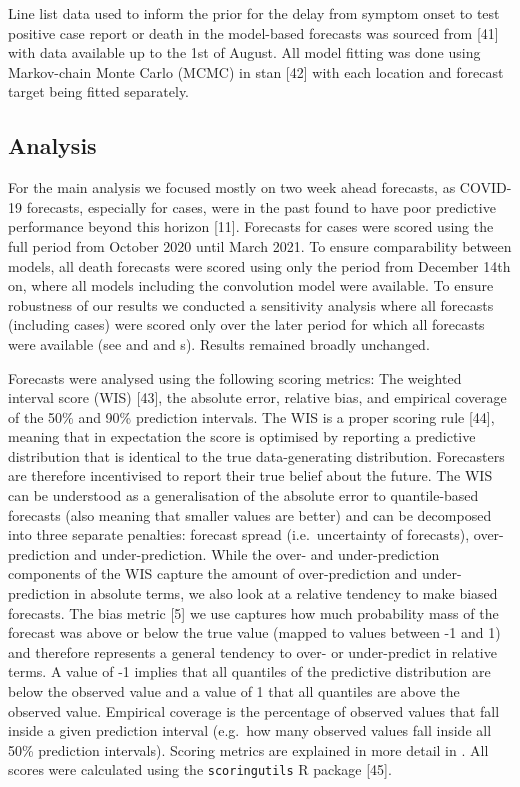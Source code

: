 \documentclass[10pt,letterpaper]{article}
\begin{document}
Line list data used to inform the prior for the delay from symptom onset
to test positive case report or death in the model-based forecasts was
sourced from {[}41{]} with data available up to the 1st of August. All
model fitting was done using Markov-chain Monte Carlo (MCMC) in stan
{[}42{]} with each location and forecast target being fitted separately.

\hypertarget{analysis}{%
\subsection{Analysis}\label{analysis}}

For the main analysis we focused mostly on two week ahead forecasts, as
COVID-19 forecasts, especially for cases, were in the past found to have
poor predictive performance beyond this horizon {[}11{]}. Forecasts for
cases were scored using the full period from October 2020 until March
2021. To ensure comparability between models, all death forecasts were
scored using only the period from December 14th on, where all models
including the convolution model were available. To ensure robustness of
our results we conducted a sensitivity analysis where all forecasts
(including cases) were scored only over the later period for which all
forecasts were available (see  and
 and s).
Results remained broadly unchanged.

Forecasts were analysed using the following scoring metrics: The
weighted interval score (WIS) {[}43{]}, the absolute error, relative
bias, and empirical coverage of the 50\% and 90\% prediction intervals.
The WIS is a proper scoring rule {[}44{]}, meaning that in expectation
the score is optimised by reporting a predictive distribution that is
identical to the true data-generating distribution. Forecasters are
therefore incentivised to report their true belief about the future. The
WIS can be understood as a generalisation of the absolute error to
quantile-based forecasts (also meaning that smaller values are better)
and can be decomposed into three separate penalties: forecast spread
(i.e.~uncertainty of forecasts), over-prediction and under-prediction.
While the over- and under-prediction components of the WIS capture the
amount of over-prediction and under-prediction in absolute terms, we
also look at a relative tendency to make biased forecasts. The bias
metric {[}5{]} we use captures how much probability mass of the forecast
was above or below the true value (mapped to values between -1 and 1)
and therefore represents a general tendency to over- or under-predict in
relative terms. A value of -1 implies that all quantiles of the
predictive distribution are below the observed value and a value of 1
that all quantiles are above the observed value. Empirical coverage is
the percentage of observed values that fall inside a given prediction
interval (e.g.~how many observed values fall inside all 50\% prediction
intervals). Scoring metrics are explained in more detail in
. All scores were calculated using the
\texttt{scoringutils} R package {[}45{]}.
\end{document}
